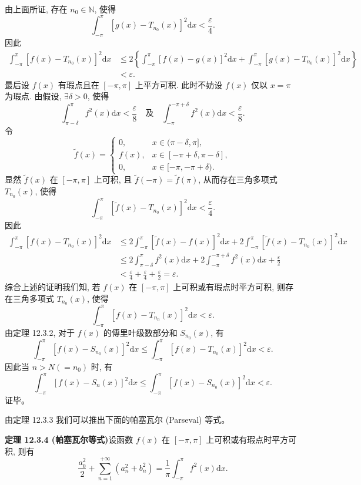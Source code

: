 \documentclass[UTF8,12pt,a4paper,fontset=fandol]{ctexart}
\begin{document}
由上面所证, 存在 $n_0\in\mathbb N$, 使得
\[
  \int_{-\pi}^{\pi}[g(x)-T_{n_0}(x)]^2\mathrm dx<\frac{\varepsilon}{4}.
\]
因此
\[
\begin{aligned}
  \int_{-\pi}^{\pi}[f(x)-T_{n_0}(x)]^2\mathrm dx
  &\leqslant
  2\left\{
    \int_{-\pi}^{\pi}[f(x)-g(x)]^2\mathrm dx
    +\int_{-\pi}^{\pi}[g(x)-T_{n_0}(x)]^2\mathrm dx
  \right\}\\
  &<\varepsilon.
\end{aligned}
\]
最后设 $f(x)$ 有瑕点且在 $[-\pi,\pi]$ 上平方可积. 此时不妨设 $f(x)$ 仅以 $x=\pi$ 为瑕点. 由假设, $\exists\delta>0$, 使得
\[
  \int_{\pi-\delta}^{\pi}f^2(x)\mathrm dx<\frac{\varepsilon}{8}
  \quad\text{及}\quad
  \int_{-\pi}^{-\pi+\delta}f^2(x)\mathrm dx<\frac{\varepsilon}{8}.
\]
令
\[
  \widetilde f(x)=
  \begin{cases}
    0, & x\in(\pi-\delta,\pi],\\
    f(x), & x\in[-\pi+\delta,\pi-\delta],\\
    0, & x\in[-\pi,-\pi+\delta).
  \end{cases}
\]
显然 $\widetilde f(x)$ 在 $[-\pi,\pi]$ 上可积, 且 $\widetilde f(-\pi)=\widetilde f(\pi)$, 从而存在三角多项式 $T_{n_0}(x)$, 使得
\[
  \int_{-\pi}^{\pi}[\widetilde f(x)-T_{n_0}(x)]^2\mathrm dx<\frac{\varepsilon}{4}.
\]
因此
\[
\begin{aligned}
  \int_{-\pi}^{\pi}[f(x)-T_{n_0}(x)]^2\mathrm dx
  &\leqslant
  2\int_{-\pi}^{\pi}[\widetilde f(x)-f(x)]^2\mathrm dx
  +2\int_{-\pi}^{\pi}[\widetilde f(x)-T_{n_0}(x)]^2\mathrm dx\\
  &\leqslant
  2\int_{\pi-\delta}^{\pi}f^2(x)\mathrm dx
  +2\int_{-\pi}^{-\pi+\delta}f^2(x)\mathrm dx
  +\frac{\varepsilon}{2}\\
  &<\frac{\varepsilon}{4}+\frac{\varepsilon}{4}+\frac{\varepsilon}{2}
  =\varepsilon.
\end{aligned}
\]
综合上述的证明我们知, 若 $f(x)$ 在 $[-\pi,\pi]$ 上可积或有瑕点时平方可积, 则存在三角多项式 $T_{n_0}(x)$, 使得
\[
  \int_{-\pi}^{\pi}[f(x)-T_{n_0}(x)]^2\mathrm dx<\varepsilon.
\]
由定理 12.3.2, 对于 $f(x)$ 的傅里叶级数部分和 $S_{n_0}(x)$, 有
\[
  \int_{-\pi}^{\pi}[f(x)-S_{n_0}(x)]^2\mathrm dx
  \leqslant
  \int_{-\pi}^{\pi}[f(x)-T_{n_0}(x)]^2\mathrm dx<\varepsilon.
\]
因此当 $n>N(=n_0)$ 时, 有
\[
  \int_{-\pi}^{\pi}[f(x)-S_n(x)]^2\mathrm dx
  \leqslant
  \int_{-\pi}^{\pi}[f(x)-S_{n_0}(x)]^2\mathrm dx<\varepsilon.
\]
证毕。

由定理 12.3.3 我们可以推出下面的帕塞瓦尔 (Parseval) 等式。

\noindent\textbf{定理 12.3.4 (帕塞瓦尔等式)}\quad 设函数 $f(x)$ 在 $[-\pi,\pi]$ 上可积或有瑕点时平方可积, 则有
\[
  \frac{a_0^2}{2}+\sum_{n=1}^{+\infty}(a_n^2+b_n^2)
  =
  \frac1\pi\int_{-\pi}^{\pi}f^2(x)\mathrm dx.
\]
\end{document}
